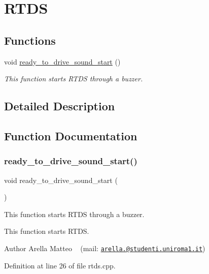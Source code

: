 \hypertarget{group___r_t_d_s__group}{}\section{R\+T\+DS}
\label{group___r_t_d_s__group}
\subsection*{Functions}
\begin{DoxyCompactItemize}
\item 
void \mbox{\hyperlink{group___r_t_d_s__group_ga31ffdce7a44b4bb83ea5b83a5ebe1188}{ready\+\_\+to\+\_\+drive\+\_\+sound\+\_\+start}} ()
\begin{DoxyCompactList}\small\item\em This function starts R\+T\+DS through a buzzer. \end{DoxyCompactList}\end{DoxyCompactItemize}


\subsection{Detailed Description}


\subsection{Function Documentation}
\mbox{\label{group___r_t_d_s__group_ga31ffdce7a44b4bb83ea5b83a5ebe1188}} 
\subsubsection{\texorpdfstring{ready\+\_\+to\+\_\+drive\+\_\+sound\+\_\+start()}{ready\_to\_drive\_sound\_start()}}
{\footnotesize\ttfamily void ready\+\_\+to\+\_\+drive\+\_\+sound\+\_\+start (\begin{DoxyParamCaption}{ }\end{DoxyParamCaption})}



This function starts R\+T\+DS through a buzzer. 

This function starts R\+T\+DS.

\begin{DoxyAuthor}{Author}
Arella Matteo ~\newline
 (mail\+: \href{mailto:arella.1646983@studenti.uniroma1.it}{\tt arella.@studenti.\+uniroma1.\+it}) 
\end{DoxyAuthor}


Definition at line 26 of file rtds.\+cpp.

